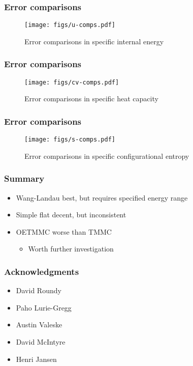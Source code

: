 \documentclass{beamer}
\let\olditem\item
\renewcommand{\item}{\setlength{\itemsep}{6pt}\olditem}
\begin{document}
\begin{frame}
  \frametitle{Error comparisons}
  \begin{figure}
    \centering
    \texttt{[image: figs/u-comps.pdf]}
    \caption{Error comparisons in specific internal energy}
  \end{figure}
\end{frame}

\begin{frame}
  \frametitle{Error comparisons}
  \begin{figure}
    \centering
    \texttt{[image: figs/cv-comps.pdf]}
    \caption{Error comparisons in specific heat capacity}
  \end{figure}
\end{frame}

\begin{frame}
  \frametitle{Error comparisons}
  \begin{figure}
    \centering
    \texttt{[image: figs/s-comps.pdf]}
    \caption{Error comparisons in specific configurational entropy}
  \end{figure}
\end{frame}

\begin{frame}
  \frametitle{Summary}
  \begin{itemize}
  \item Wang-Landau best, but requires specified energy range
  \item Simple flat decent, but inconsistent
  \item OETMMC worse than TMMC
    \begin{itemize}
    \item Worth further investigation
    \end{itemize}
  \end{itemize}
\end{frame}

\begin{frame}
  \frametitle{Acknowledgments}
  \begin{itemize}
  \item David Roundy
  \item Paho Lurie-Gregg
  \item Austin Valeske
  \item David McIntyre
  \item Henri Jansen
  \end{itemize}
\end{frame}
\end{document}
